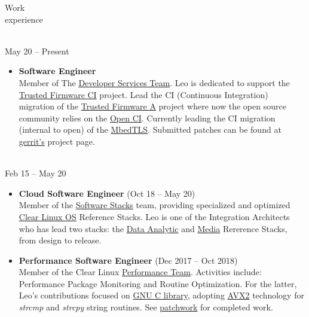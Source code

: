 \documentclass{resume}
\def\linaro{Linaro Limited}
\def\intel{Intel Corporation}
\def\cl{Clear Linux OS}
\begin{document}
\begin{category}{Work \\experience}

\citem{\linaro}\\
May 20 -- Present

\begin{itemize}
\item \textbf{Software Engineer}\\
  Member of The \href{https://www.linaro.org/services/}{Developer Services Team}. Leo is dedicated to support the
  \href{https://www.trustedfirmware.org/projects/open-ci/}{Trusted Firmware CI} project.
  Lead the CI (Continuous Integration) migration of the \href{https://www.trustedfirmware.org/projects/tf-a/}{Trusted Firmware A}
  project where now the open source community relies on the \href{https://ci.trustedfirmware.org/}{Open CI}.
  Currently leading the CI migration (internal to open) of the \href{https://github.com/ARMmbed/mbedtls}{MbedTLS}.
  Submitted patches can be found at \href{https://review.trustedfirmware.org/q/owner:leonardo.sandoval%2540linaro.org}{gerrit's}
  project page.
\end{itemize}

\citem{\intel}\\
Feb 15 -- May 20
\begin{itemize}
\item \textbf{Cloud Software Engineer} (Oct 18 -- May 20)\\
  Member of the \href{https://github.com/intel/stacks}{Software Stacks} team,
  providing specialized and optimized \href{https://clearlinux.org/}{\cl} Reference Stacks.
  Leo is one of the Integration Architects who has lead two stacks:
  the \href{https://github.com/intel/stacks/blob/master/dars/dars.rst}{Data Analytic}
  and \href{https://github.com/intel/stacks/blob/master/mers/README.md}{Media} Rererence Stacks,
  from design to release.
\end{itemize}

\begin{itemize}
\item \textbf{Performance Software Engineer} (Dec 2017 -- Oct 2018)\\
  Member of the Clear Linux \href{https://clearlinux.org/}{Performance Team}.
  Activities include: Performance Package Monitoring and Routine Optimization.
  For the latter, Leo's contributions focused on
  \href{https://www.gnu.org/software/libc/}{GNU C library},
  adopting \href{}{AVX2} technology for \textit{strcmp} and \textit{strcpy} string routines.
  See \href{https://patchwork.ozlabs.org/project/glibc/list/?submitter=74072}{patchwork}
  for completed work.
\end{itemize}


\end{category}
\end{document}
